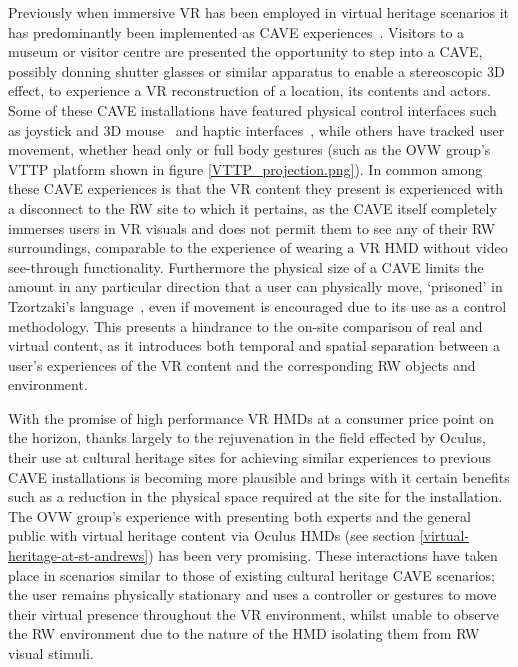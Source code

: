 Previously when immersive VR has been employed in virtual heritage scenarios it has predominantly been implemented as CAVE experiences~\cite{Roussou2002}. Visitors to a museum or visitor centre are presented the opportunity to step into a CAVE, possibly donning shutter glasses or similar apparatus to enable a stereoscopic 3D effect, to experience a VR reconstruction of a location, its contents and actors. Some of these CAVE installations have featured physical control interfaces such as joystick and 3D mouse~\cite{cabral:x3dexperience} and haptic interfaces~\cite{Christou2006}, while others have tracked user movement, whether head only or full body  gestures (such as the OVW group's VTTP platform shown in figure \ref{VTTP_projection.png}). In common among these CAVE experiences is that the VR content they present is experienced with a disconnect to the RW site to which it pertains, as the CAVE itself completely immerses users in VR visuals and does not permit them to see any of their RW surroundings, comparable to the experience of wearing a VR HMD without video see-through functionality. Furthermore the physical size of a CAVE limits the amount in any particular direction that a user can physically move, `prisoned' in Tzortzaki's language~\cite{Tzortzaki2002}, even if movement is encouraged due to its use as a control methodology. This presents a hindrance to the on-site comparison of real and virtual content, as it introduces both temporal and spatial separation between a user's experiences of the VR content and the corresponding RW objects and environment.

With the promise of high performance VR HMDs at a consumer price point on the horizon, thanks largely to the rejuvenation in the field effected by Oculus, their use at cultural heritage sites for achieving similar experiences to previous CAVE installations is becoming more plausible and brings with it certain benefits such as a reduction in the physical space required at the site for the installation. The OVW group's experience with presenting both experts and the general public with virtual heritage content via Oculus HMDs (see section \ref{virtual-heritage-at-st-andrews}) has been very promising. These interactions have taken place in scenarios similar to those of existing cultural heritage CAVE scenarios; the user remains physically stationary and uses a controller or gestures to move their virtual presence throughout the VR environment, whilst unable to observe the RW environment due to the nature of the HMD isolating them from RW visual stimuli.

